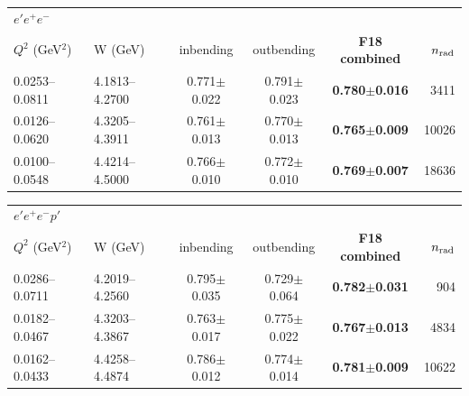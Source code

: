 \begin{tabular}{llcccr}\toprule
\multicolumn{6}{l}{$e'e^+e^-$}\\
$Q^2$ (GeV$^2$) & W (GeV) & inbending & outbending & \textbf{F18 combined} & $n_{\rm rad}$ \\\midrule
0.0253--0.0811 & 4.1813--4.2700 & 0.771$\pm$0.022 & 0.791$\pm$0.023 & \textbf{0.780$\pm$0.016} & 3411 \\
0.0126--0.0620 & 4.3205--4.3911 & 0.761$\pm$0.013 & 0.770$\pm$0.013 & \textbf{0.765$\pm$0.009} & 10026 \\
0.0100--0.0548 & 4.4214--4.5000 & 0.766$\pm$0.010 & 0.772$\pm$0.010 & \textbf{0.769$\pm$0.007} & 18636 \\
\bottomrule\end{tabular}

\medskip

\begin{tabular}{llcccr}\toprule
\multicolumn{6}{l}{$e'e^+e^-p'$}\\
$Q^2$ (GeV$^2$) & W (GeV) & inbending & outbending & \textbf{F18 combined} & $n_{\rm rad}$ \\\midrule
0.0286--0.0711 & 4.2019--4.2560 & 0.795$\pm$0.035 & 0.729$\pm$0.064 & \textbf{0.782$\pm$0.031} & 904 \\
0.0182--0.0467 & 4.3203--4.3867 & 0.763$\pm$0.017 & 0.775$\pm$0.022 & \textbf{0.767$\pm$0.013} & 4834 \\
0.0162--0.0433 & 4.4258--4.4874 & 0.786$\pm$0.012 & 0.774$\pm$0.014 & \textbf{0.781$\pm$0.009} & 10622 \\
\bottomrule\end{tabular}

\medskip

